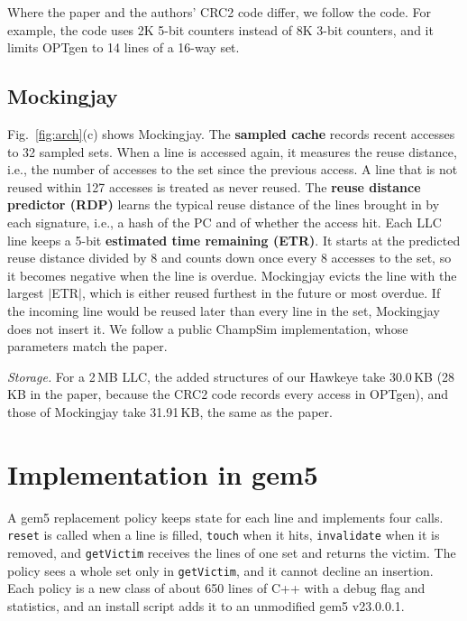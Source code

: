 \documentclass[11pt,conference]{IEEEtran}
\begin{document}
Where the paper and the authors' CRC2 code differ, we follow the code. For
example, the code uses 2K 5-bit counters instead of 8K 3-bit counters, and it
limits OPTgen to 14 lines of a 16-way set.

\subsection{Mockingjay}

Fig.~\ref{fig:arch}(c) shows Mockingjay. The \textbf{sampled cache} records
recent accesses to 32 sampled sets. When a line is accessed again, it measures
the reuse distance, i.e., the number of accesses to the set since the previous
access. A line that is not reused within 127 accesses is treated as never
reused. The \textbf{reuse distance predictor (RDP)} learns the typical reuse
distance of the lines brought in by each signature, i.e., a hash of the PC and
of whether the access hit. Each LLC line keeps a 5-bit \textbf{estimated time
remaining (ETR)}. It starts at the predicted reuse distance divided by 8 and
counts down once every 8 accesses to the set, so it becomes negative when the
line is overdue. Mockingjay evicts the line with the largest $|$ETR$|$, which is
either reused furthest in the future or most overdue. If the incoming line
would be reused later than every line in the set, Mockingjay does not insert
it. We follow a public ChampSim implementation, whose parameters match the
paper.

\emph{Storage.} For a 2\,MB LLC, the added structures of our Hawkeye take
30.0\,KB (28\,KB in the paper, because the CRC2 code records every access in
OPTgen), and those of Mockingjay take 31.91\,KB, the same as the paper.

\section{Implementation in gem5}
\label{sec:impl}

A gem5 replacement policy keeps state for each line and implements four calls.
\texttt{reset} is called when a line is filled, \texttt{touch} when it hits,
\texttt{invalidate} when it is removed, and \texttt{getVictim} receives the
lines of one set and returns the victim. The policy sees a whole set only in
\texttt{getVictim}, and it cannot decline an insertion. Each policy is a new
class of about 650 lines of C++ with a debug flag and statistics, and an
install script adds it to an unmodified gem5 v23.0.0.1.
\end{document}
